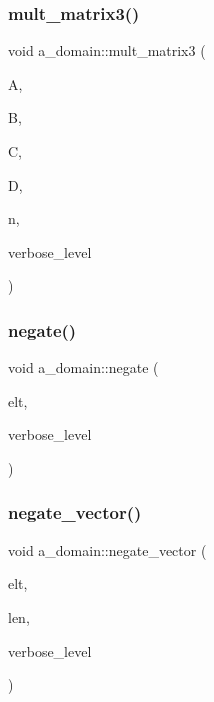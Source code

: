 \subsubsection{\texorpdfstring{mult\+\_\+matrix3()}{mult\_matrix3()}}
{\footnotesize\ttfamily void a\+\_\+domain\+::mult\+\_\+matrix3 (\begin{DoxyParamCaption}\item[{\mbox{\hyperlink{galois_8h_a09fddde158a3a20bd2dcadb609de11dc}{I\+NT}} $\ast$}]{A,  }\item[{\mbox{\hyperlink{galois_8h_a09fddde158a3a20bd2dcadb609de11dc}{I\+NT}} $\ast$}]{B,  }\item[{\mbox{\hyperlink{galois_8h_a09fddde158a3a20bd2dcadb609de11dc}{I\+NT}} $\ast$}]{C,  }\item[{\mbox{\hyperlink{galois_8h_a09fddde158a3a20bd2dcadb609de11dc}{I\+NT}} $\ast$}]{D,  }\item[{\mbox{\hyperlink{galois_8h_a09fddde158a3a20bd2dcadb609de11dc}{I\+NT}}}]{n,  }\item[{\mbox{\hyperlink{galois_8h_a09fddde158a3a20bd2dcadb609de11dc}{I\+NT}}}]{verbose\+\_\+level }\end{DoxyParamCaption})}

\mbox{\label{classa__domain_a13f69fa177cc5e2066c216174bee4295}} 
\subsubsection{\texorpdfstring{negate()}{negate()}}
{\footnotesize\ttfamily void a\+\_\+domain\+::negate (\begin{DoxyParamCaption}\item[{\mbox{\hyperlink{galois_8h_a09fddde158a3a20bd2dcadb609de11dc}{I\+NT}} $\ast$}]{elt,  }\item[{\mbox{\hyperlink{galois_8h_a09fddde158a3a20bd2dcadb609de11dc}{I\+NT}}}]{verbose\+\_\+level }\end{DoxyParamCaption})}

\mbox{\label{classa__domain_a53ddd746b3e3bb818262d683117b7647}} 
\subsubsection{\texorpdfstring{negate\+\_\+vector()}{negate\_vector()}}
{\footnotesize\ttfamily void a\+\_\+domain\+::negate\+\_\+vector (\begin{DoxyParamCaption}\item[{\mbox{\hyperlink{galois_8h_a09fddde158a3a20bd2dcadb609de11dc}{I\+NT}} $\ast$}]{elt,  }\item[{\mbox{\hyperlink{galois_8h_a09fddde158a3a20bd2dcadb609de11dc}{I\+NT}}}]{len,  }\item[{\mbox{\hyperlink{galois_8h_a09fddde158a3a20bd2dcadb609de11dc}{I\+NT}}}]{verbose\+\_\+level }\end{DoxyParamCaption})}

